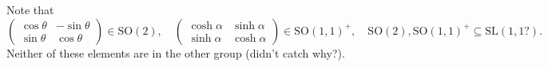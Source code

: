 Note that \[
\begin{pmatrix}
    \cos \theta & -\sin \theta \\
    \sin \theta & \cos \theta
\end{pmatrix} \in  \mathrm{SO}(2), \quad 
\begin{pmatrix}
    \cosh \alpha  & \sinh \alpha  \\
    \sinh \alpha & \cosh \alpha 
\end{pmatrix} \in  \mathrm {SO} (1,1)^+,\quad \mathrm {SO}(2),\mathrm{SO}(1,1)^+ \subseteq \mathrm {SL}(1,1?).
\] Neither of these elements are in the other group (didn't catch why?).

